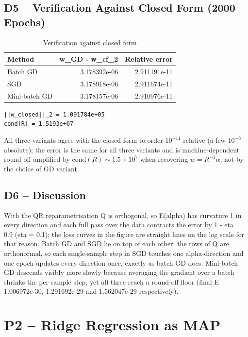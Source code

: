 \documentclass[10pt,a4paper]{article}
\begin{document}
\subsection{D5 -- Verification Against Closed Form (2000 Epochs)}
\begin{table}[H]
\centering
\caption{Verification against closed form}
\small
\begin{tabular}{|lrr|}
\toprule
Method & \textbar{}\textbar{}w\_GD - w\_cf\textbar{}\textbar{}\_2 & Relative error \\
\midrule
Batch GD & 3.178392e-06 & 2.911191e-11 \\
SGD & 3.178918e-06 & 2.911674e-11 \\
Mini-batch GD & 3.178157e-06 & 2.910976e-11 \\
\bottomrule
\end{tabular}
\end{table}

\begin{Verbatim}[frame=single,fontsize=\small]
||w_closed||_2 = 1.091784e+05
cond(R) = 1.5193e+07
\end{Verbatim}
All three variants agree with the closed form to order $10^{-11}$ relative (a few $10^{-6}$ absolute); the error is the same for all three variants and is machine-dependent round-off amplified by $\mathrm{cond}(R) \sim 1.5\times 10^7$ when recovering $w = R^{-1}\alpha$, not by the choice of GD variant.

\subsection{D6 -- Discussion}
With the QR reparametrisation Q is orthogonal, so E(alpha) has curvature 1 in every direction and each full pass over the data contracts the error by \textbar{}1 - eta\textbar{} = 0.9 (eta = 0.1); the loss curves in the figure are straight lines on the log scale for that reason. Batch GD and SGD lie on top of each other: the rows of Q are orthonormal, so each single-sample step in SGD touches one alpha-direction and one epoch updates every direction once, exactly as batch GD does. Mini-batch GD descends visibly more slowly because averaging the gradient over a batch shrinks the per-sample step, yet all three reach a round-off floor (final E 1.006972e-30, 1.291692e-29 and 1.562047e-29 respectively).

\section{P2 -- Ridge Regression as MAP}
\end{document}

